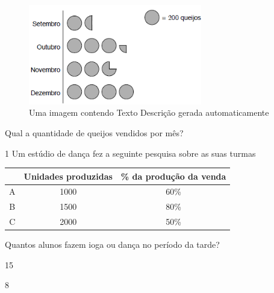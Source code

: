 {{{\begin{escolha}
{{{{{\begin{escolha}
\begin{escolha}
{\begin{q°}
\begin{figure}
\centering
\includegraphics[width=2.97917in,height=1.71639in]{./_SAEB_9_MAT/media/image223.png}
\caption{Uma imagem contendo Texto Descrição gerada automaticamente}
\end{figure}


Qual a quantidade de queijos vendidos por mês?



\num{1}
  Um estúdio de dança fez a seguinte pesquisa sobre as suas turmas 

\begin{table}[]
\begin{tabular}{c|c|c}
\hline
\rowcolor[HTML]{C0C0C0} 
\multicolumn{1}{|c|}{\cellcolor[HTML]{C0C0C0}\textbf{Montadora}} & \textbf{Unidades produzidas} & \multicolumn{1}{c|}{\cellcolor[HTML]{C0C0C0}\textbf{\% da produção da venda}} \\ \hline
A & 1000 & 60\% \\ \hline
B & 1500 & 80\% \\ \hline
C & 2000 & 50\% \\ \hline
\end{tabular}
\end{table}

Quantos alunos fazem ioga ou dança no período da tarde?

\begin{escolha}

  \item 15

  \item 8


\end{escolha}
\end{q°}}
\end{escolha}
\end{escolha}}}}}}
\end{escolha}}}}
